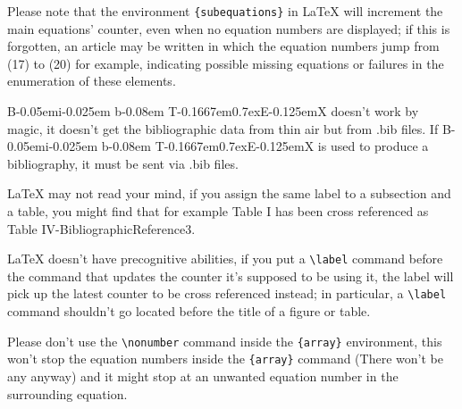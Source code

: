 \documentclass[letterpaper, 10pt, conference]{IEEEtran} %
\def \BibTeX{
	{\rm B\kern-0.05em{\sc i\kern-0.025em b}\kern-0.08em
	T\kern-0.1667em\lower0.7ex\hbox{E}\kern-0.125emX}
}
\begin{document}
	Please note that the environment \verb|{subequations}| in {\LaTeX} will increment the main equations' counter, even when no equation numbers are displayed; if this is forgotten, an article may be written in which the equation numbers jump from (17) to (20) for example, indicating possible missing equations or failures in the enumeration of these elements.
	
	{\BibTeX} doesn't work by magic, it doesn't get the bibliographic data from thin air but from .bib files. If {\BibTeX} is used to produce a bibliography, it must be sent via .bib files.
	
	{\LaTeX} may not read your mind, if you assign the same label to a subsection and a table, you might find that for example Table I has been cross referenced as Table IV-BibliographicReference3.
	
	{\LaTeX} doesn't have precognitive abilities, if you put a \verb|\label| command before the command that updates the counter it's supposed to be using it, the label will pick up the latest counter to be cross referenced instead; in particular, a \verb|\label| command shouldn't go located before the title of a figure or table.
	
	Please don't use the \verb|\nonumber| command inside the \verb|{array}| environment, this won't stop the equation numbers inside the \verb|{array}| command (There won't be any anyway) and it might stop at an unwanted equation number in the surrounding equation.
	
\end{document}
